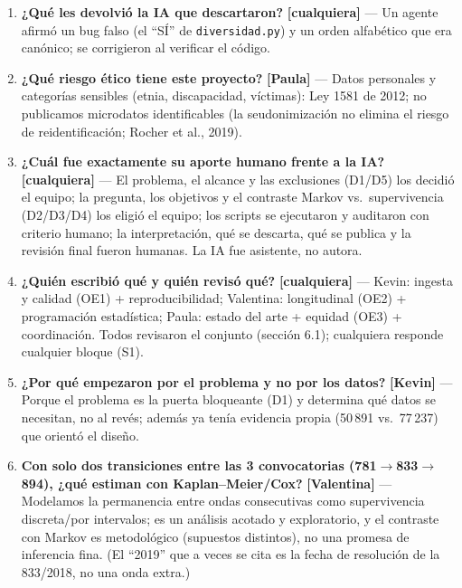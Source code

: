 \documentclass[11pt,a4paper]{article}
\newcommand{\quien}[1]{\textbf{[#1]}}
\begin{document}
\begin{enumerate}[label=\textbf{P\arabic*.}]
        investigadores reconocidos no ha sido auditado. Queremos saber si es
        confiable, comparable y equitativo, con evidencia reproducible.''
  \item \textbf{¿Qué les devolvió la IA que descartaron?} \quien{cualquiera}
        --- Un agente afirmó un bug falso (el ``SÍ'' de
        \texttt{diversidad.py}) y un orden alfabético que era canónico; se
        corrigieron al verificar el código.
  \item \textbf{¿Qué riesgo ético tiene este proyecto?} \quien{Paula} --- Datos
        personales y categorías sensibles (etnia, discapacidad, víctimas):
        Ley 1581 de 2012; no publicamos microdatos identificables (la
        seudonimización no elimina el riesgo de reidentificación; Rocher et
        al., 2019).
  \item \textbf{¿Cuál fue exactamente su aporte humano frente a la IA?}
        \quien{cualquiera} --- El problema, el alcance y las exclusiones
        (D1/D5) los decidió el equipo; la pregunta, los objetivos y el
        contraste Markov vs.\ supervivencia (D2/D3/D4) los eligió el equipo;
        los scripts se ejecutaron y auditaron con criterio humano; la
        interpretación, qué se descarta, qué se publica y la revisión final
        fueron humanas. La IA fue asistente, no autora.
  \item \textbf{¿Quién escribió qué y quién revisó qué?} \quien{cualquiera}
        --- Kevin: ingesta y calidad (OE1) + reproducibilidad; Valentina:
        longitudinal (OE2) + programación estadística; Paula: estado del arte +
        equidad (OE3) + coordinación. Todos revisaron el conjunto (sección
        6.1); cualquiera responde cualquier bloque (S1).
  \item \textbf{¿Por qué empezaron por el problema y no por los datos?}
        \quien{Kevin} --- Porque el problema es la puerta bloqueante (D1) y
        determina qué datos se necesitan, no al revés; además ya tenía
        evidencia propia (50\,891 vs.\ 77\,237) que orientó el diseño.
  \item \textbf{Con solo dos transiciones entre las 3 convocatorias
        (781$\rightarrow$833$\rightarrow$894), ¿qué estiman con
        Kaplan--Meier/Cox?} \quien{Valentina} --- Modelamos la permanencia entre
        ondas consecutivas como supervivencia discreta/por intervalos; es un
        análisis acotado y exploratorio, y el contraste con Markov es
        metodológico (supuestos distintos), no una promesa de inferencia fina.
        (El ``2019'' que a veces se cita es la fecha de resolución de la
        833/2018, no una onda extra.)
\end{enumerate}
\end{document}
